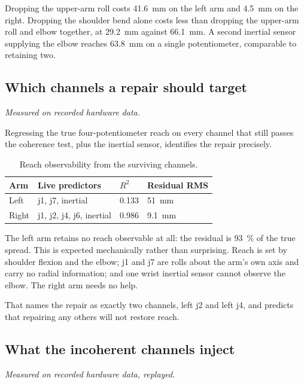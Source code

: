 Dropping the upper-arm roll costs \SI{41.6}{\milli\metre} on the left arm and
\SI{4.5}{\milli\metre} on the right. Dropping the shoulder bend alone costs
less than dropping the upper-arm roll and elbow together, at
\SI{29.2}{\milli\metre} against \SI{66.1}{\milli\metre}. A second inertial
sensor supplying the elbow reaches \SI{63.8}{\milli\metre} on a single
potentiometer, comparable to retaining two.

\subsection{Which channels a repair should target}

\emph{Measured on recorded hardware data.}

Regressing the true four-potentiometer reach on every channel that still
passes the coherence test, plus the inertial sensor, identifies the repair
precisely.

\begin{table}[htbp]
  \centering
  \caption{Reach observability from the surviving channels.}
  \label{tab:reachobs}
  \begin{tabular}{@{}llll@{}}
    \toprule
    Arm & Live predictors & $R^2$ & Residual RMS \\
    \midrule
    Left  & j1, j7, inertial            & \num{0.133} & \SI{51}{\milli\metre} \\
    Right & j1, j2, j4, j6, inertial    & \num{0.986} & \SI{9.1}{\milli\metre} \\
    \bottomrule
  \end{tabular}
\end{table}

The left arm retains no reach observable at all: the residual is
\SI{93}{\percent} of the true spread. This is expected mechanically rather
than surprising. Reach is set by shoulder flexion and the elbow; j1 and j7 are
rolls about the arm's own axis and carry no radial information; and one wrist
inertial sensor cannot observe the elbow. The right arm needs no help.

That names the repair as exactly two channels, left j2 and left j4, and
predicts that repairing any others will not restore reach.

\subsection{What the incoherent channels inject}

\emph{Measured on recorded hardware data, replayed.}

